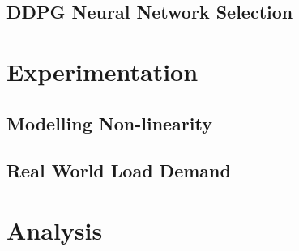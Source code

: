
\subsection{DDPG Neural Network Selection}



\section{Experimentation}


\subsection{Modelling Non-linearity}


\subsection{Real World Load Demand}


\section{Analysis}